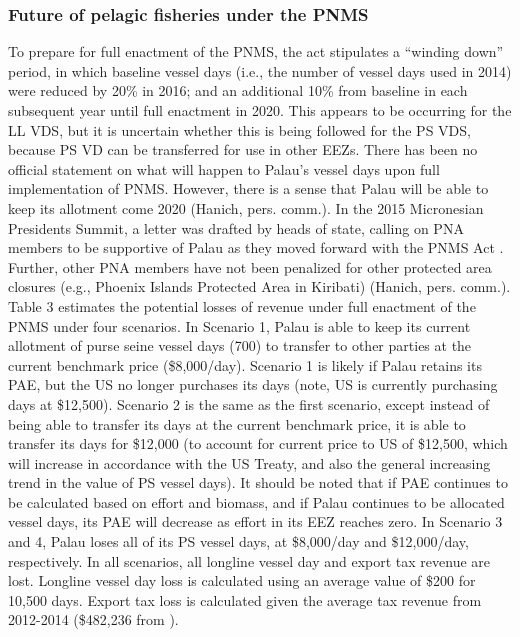 \documentclass[11pt,english]{article}
\begin{document}
\subsubsection{Future of pelagic fisheries under the PNMS}

To prepare for full enactment of the PNMS, the act stipulates a “winding down” period, in which baseline vessel days (i.e., the number of vessel days used in 2014) were reduced by 20\% in 2016; and an additional 10\% from baseline in each subsequent year until full enactment in 2020. This appears to be occurring for the LL VDS, but it is uncertain whether this is being followed for the PS VDS, because PS VD can be transferred for use in other EEZs. There has been no official statement on what will happen to Palau’s vessel days upon full implementation of PNMS. However, there is a sense that Palau will be able to keep its allotment come 2020 (Hanich, pers. comm.). In the 2015 Micronesian Presidents Summit, a letter was drafted by heads of state, calling on PNA members to be supportive of Palau as they moved forward with the PNMS Act \citep{Senase2015}. Further, other PNA members have not been penalized for other protected area closures (e.g., Phoenix Islands Protected Area in Kiribati) (Hanich, pers. comm.).
Table 3 estimates the potential losses of revenue under full enactment of the PNMS under four scenarios. In Scenario 1, Palau is able to keep its current allotment of purse seine vessel days (700) to transfer to other parties at the current benchmark price (\$8,000/day). Scenario 1 is likely if Palau retains its PAE, but the US no longer purchases its days (note, US is currently purchasing days at \$12,500). Scenario 2 is the same as the first scenario, except instead of being able to transfer its days at the current benchmark price, it is able to transfer its days for \$12,000 (to account for current price to US of \$12,500, which will increase in accordance with the US Treaty, and also the general increasing trend in the value of PS vessel days). It should be noted that if PAE continues to be calculated based on effort and biomass, and if Palau continues to be allocated vessel days, its PAE will decrease as effort in its EEZ reaches zero. In Scenario 3 and 4, Palau loses all of its PS vessel days, at \$8,000/day and \$12,000/day, respectively. In all scenarios, all longline vessel day and export tax revenue are lost. Longline vessel day loss is calculated using an average value of \$200 for 10,500 days. Export tax loss is calculated given the average tax revenue from 2012-2014 (\$482,236  from \cite{Gillett2016}). 
\end{document}
